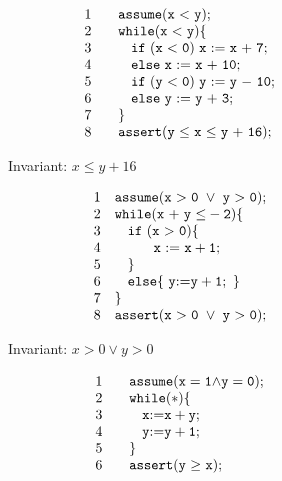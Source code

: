 \begin{figure}[t]
\begin{subfigure}{0.5\textwidth}
    \raggedright
\[
 \begin{array}{ll}
1 & \code{~~~ assume(x~{<}~y);}  \\
2 & \code{~~~ while(x~{<}~y)\{}  \\
3 & \code{~~~ \quad if~(x~{<}~0)~x~{:=}~x~{+}~7;}  \\
4 & \code{~~~ \quad else~ x~{:=}~x~{+}~10;}\\
5 & \code{~~~ \quad if~(y~{<}~0)~y~{:=}~y~{-}~10;} \\
6 & \code{~~~ \quad else~ y~{:=}~y~{+}~3;}\\
7 & \code{~~~\}} \\
8 & \code{~~~assert(y~{\leq}~x~{\leq}~y~{+}~16);}
\end{array}
\]
    \caption{Invariant: $x \le y + 16$}
    \label{fig:running:example:programa}
\end{subfigure}%
\begin{subfigure}{.5\textwidth}
        \[
      \begin{array}{ll}
      1 & \code{assume(x~{>}~0~\lor~y~{>}~0);}  \\
      2 & \code{while(x~{+}~y~{\le}-2)\{}  \\
      3 & \code{\quad if~(x~{>}~0) \{}  \\
      4 & \code{\quad \quad ~~~x~{:=}~x+1;}  \\
      5 & \code{\quad \}} \\
      6 & \code{\quad else \{~y {:=} y + 1;~\}}\\
      7 & \code{\}} \\
      8 & \code{assert(x~{>}~0~ \lor ~y~{>}~0);}\\
      \end{array}
    \]
    \caption{Invariant: $x > 0 \lor y > 0$}
\end{subfigure}
   \begin{subfigure}{0.5\textwidth}
    \raggedright
     \vspace{0.3cm}
\[
 \begin{array}{ll}
1 & \code{~~~ assume(x=1 {\land} y=0);}  \\
2 & \code{~~~ while(*)\{}  \\
3 & \code{~~~ \quad x {:=} x + y;}  \\
4 & \code{~~~ \quad y {:=} y + 1;}\\
5 & \code{~~~\}} \\
6 & \code{~~~assert(y~{\geq}~x);}

\end{array}\]
\end{subfigure}
\end{figure}

